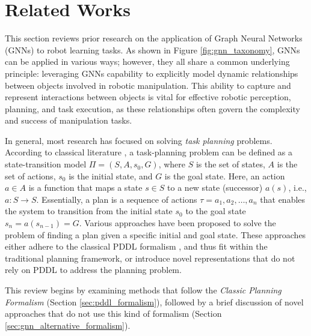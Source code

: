 \section{Related Works}
\label{sec:gnn_related_works}
This section reviews prior research on the application of Graph Neural Networks (GNNs) to robot learning tasks. As shown in Figure \ref{fig:gnn_taxonomy}, GNNs can be applied in various ways; however, they all share a common underlying principle: leveraging GNNs capability to explicitly model dynamic relationships between objects involved in robotic manipulation. This ability to capture and represent interactions between objects is vital for effective robotic perception, planning, and task execution, as these relationships often govern the complexity and success of manipulation tasks.




In general, most research has focused on solving \textit{task planning} problems. According to classical literature \cite{geffner2013concise}, a task-planning problem can be defined as a state-transition model $\Pi = \left( S, A, s_{0}, G \right)$, where $S$ is the set of states, $A$ is the set of actions, $s_{0}$ is the initial state, and $G$ is the goal state. Here, an action $a \in A$ is a function that maps a state $s \in S$ to a new state (successor) $a(s)$, i.e., $a: S \rightarrow S$. Essentially, a plan is a sequence of actions $\tau = a_{1}, a_{2}, \dots, a_{n}$ that enables the system to transition from the initial state $s_{0}$ to the goal state $s_{n} = a(s_{n-1}) = G$. Various approaches have been proposed to solve the problem of finding a plan given a specific initial and goal state. These approaches either adhere to the classical PDDL formalism \cite{aeronautiques1998pddl}, and thus fit within the traditional planning framework, or introduce novel representations that do not rely on PDDL to address the planning problem.

This review begins by examining methods that follow the \textit{Classic Planning Formalism}  (Section \ref{sec:pddl_formalism}), followed by a brief discussion of novel approaches that do not use this kind of formalism (Section \ref{sec:gnn_alternative_formalism}).



